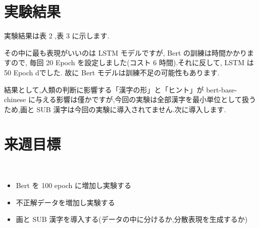 \documentclass[draftclsnofoot,onecolumn]{jarticle}
\begin{document}
\section{実験結果}

実験結果は表 2 ,表 3 に示します.

\begin{table}[h]
\centering
\caption{各モデルの実験結果}
\label{b}
\centering
{}
\end{table}

その中に最も表現がいいのは LSTM モデルですが, Bert の訓練は時間かかりますので, 毎回 20 Epoch を設定しました(コスト 6 時間).それに反して, LSTM は 50 Epoch dでした. 故に Bert モデルは訓練不足の可能性もあります. 

\begin{table}[h]
\centering
\caption{Bertと違うデータセットの実験結果}
\label{c}
\centering
{}
\end{table}
結果として,人類の判断に影響する「漢字の形」と「ヒント」が bert-base-chinese に与える影響は僅かですが,今回の実験は全部漢字を最小単位として扱うため,画と SUB 漢字は今回の実験に導入されてません.次に導入します.
\section{来週目標}
　\begin{itemize}
	\item Bert を 100 epoch に増加し実験する
	\item 不正解データを増加し実験する
	\item 画と SUB 漢字を導入する(データの中に分けるか,分散表現を生成するか)

	\end{itemize}




\end{document}
